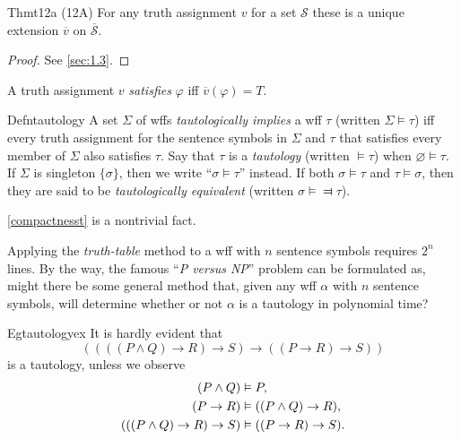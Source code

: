 \begin{reference}{Thm}{t12a}
  (12A) For any truth assignment $v$ for a set $\mathcal{S}$ these is a unique extension $\overline{v}$ on $\overline{\mathcal{S}}$.
\end{reference}

\begin{proof}
  See \ref{sec:1.3}.
\end{proof}

A truth assignment $v$ \textit{satisfies} $\varphi$ iff $\overline{v}(\varphi)=T$.

\begin{reference}{Defn}{tautology}
  A set $\Sigma$ of wffs \textit{tautologically implies} a wff $\tau$ (written $\Sigma\vDash\tau$) iff every truth assignment for the sentence symbols in $\Sigma$ and $\tau$ that satisfies every member of $\Sigma$ also satisfies $\tau$. Say that $\tau$ is a \textit{tautology} (written $\vDash \tau$) when $\varnothing\vDash \tau$. If $\Sigma$ is singleton $\{\sigma\}$, then we write ``$\sigma\vDash \tau$'' instead. If both $\sigma\vDash \tau$ and $\tau\vDash \sigma$, then they are said to be \textit{tautologically equivalent} (written $\sigma\vDash\Dashv\tau$).
\end{reference}

\ref{compactnesst} is a nontrivial fact.

Applying the \textit{truth-table} method to a wff with $n$ sentence symbols requires $2^n$ lines. By the way, the famous ``\textit{P versus NP}'' problem can be formulated as, might there be some general method that, given any wff $\alpha$ with $n$ sentence symbols, will determine whether or not $\alpha$ is a tautology in polynomial time?

\begin{reference}{Eg}{tautologyex}
  It is hardly evident that
  \[
    ((((P\wedge Q)\rightarrow R)\rightarrow S)\rightarrow((P \rightarrow R)\rightarrow S))
  \]
  is a tautology, unless we observe
  \begin{align*}
    (P\wedge Q)                               & \vDash P,                                       \\
    (P\rightarrow R)                          & \vDash ((P\wedge Q)\rightarrow R),              \\
    (((P\wedge Q)\rightarrow R)\rightarrow S) & \vDash ((P\rightarrow R)\rightarrow S).\qedhere
  \end{align*}
\end{reference}

